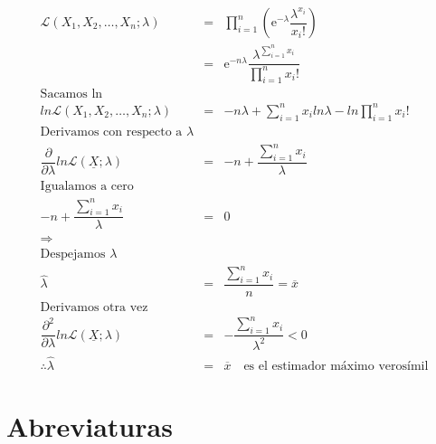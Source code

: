 \begin{appendices}
\begin{defn}
\begin{eqnarray*}
\mathcal{L}(X_{1}, X_{2},\ldots, X_{n}; \lambda) &=& \displaystyle \prod_{i = 1}^{n} \left( \mathrm{e}^{-\lambda} \dfrac{\lambda^{x_{i}}}{x_{i}!} \right)\\
												 &=& \mathrm{e}^{-n \lambda} \dfrac{\lambda^{\displaystyle \sum_{i = 1}^{n} x_{i}}}{\displaystyle  \prod_{i = 1}^{n} x_{i}!}\\
\text{Sacamos ln}\\
ln \mathcal{L}(X_{1}, X_{2}, \ldots, X_{n};\lambda) &=& -n\lambda + \displaystyle \sum_{i = 1}^{n} x_{i} ln \lambda - ln \displaystyle  \prod_{i = 1}^{n} x_{i}! \\
\text{Derivamos con respecto a } \lambda\\
\dfrac{\partial}{\partial \lambda} ln \mathcal{L}(\underline{X};\lambda) &=& -n + \dfrac{\displaystyle \sum_{i = 1}^{n} x_{i}}{\lambda} \\
\text{Igualamos a cero}\\
-n + \dfrac{\displaystyle \sum_{i = 1}^{n} x_{i}}{\lambda} &=& 0 \\
\Rightarrow\\
\text{Despejamos } \lambda\\
\hat{\lambda} &=& \dfrac{\displaystyle \sum_{i = 1}^{n} x_{i}}{n} = \overline{x}\\
\text{Derivamos otra vez}\\
\dfrac{\partial^{2}}{\partial \lambda} ln \mathcal{L}(\underline{X};\lambda)  &=& - \dfrac{\displaystyle \sum_{i = 1}^{n} x_{i}}{\lambda^{2}} < 0\\
\therefore \hat{\lambda} &=& \overline{x} \,\,\,\,\,\, \text{es el estimador máximo verosímil}
\end{eqnarray*}
\end{defn}






\chapter{Abreviaturas} %


\end{appendices}
